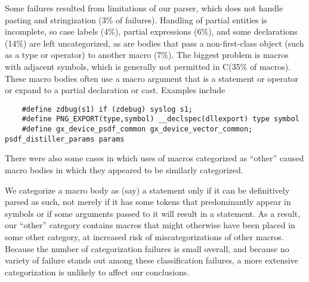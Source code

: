 \documentclass[10pt]{article}
\begin{document}
\begin{description}
  Some failures resulted from limitations of our parser, which does not
  handle pasting and stringization (3\% of failures).  Handling of partial
  entities is incomplete, so case labels (4\%), partial expressions (6\%),
  and some declarations (14\%) are left uncategorized, as are bodies that
  pass a non-first-class object (such as a type or operator) to another
  macro (7\%).  The biggest problem is macros with adjacent symbols, which
  is generally not permitted in C\@ (35\% of macros).  These macro bodies
  often use a macro argument that is a statement or operator or expand to
  a partial declaration or cast.  Examples include
\begin{verbatim}
    #define zdbug(s1) if (zdebug) syslog s1;
    #define PNG_EXPORT(type,symbol) __declspec(dllexport) type symbol
    #define gx_device_psdf_common gx_device_vector_common; psdf_distiller_params params
\end{verbatim}
  There were also some cases in which uses of macros categorized as
  ``other'' caused macro bodies in which they appeared to be similarly
  categorized.
  
  We categorize a macro body as (say) a statement only if it can be
  definitively parsed as such, not merely if it has some tokens that
  predominantly appear in symbols or if some arguments passed to it will
  result in a statement.  As a result, our ``other'' category contains
  macros that might otherwise have been placed in some other category, at
  increased risk of miscategorizations of other macros.  Because the number
  of categorization failures is small overall, and because no variety of
  failure stands out among these classification failures, a more extensive
  categorization is unlikely to affect our conclusions.

\end{description}




\end{document}
